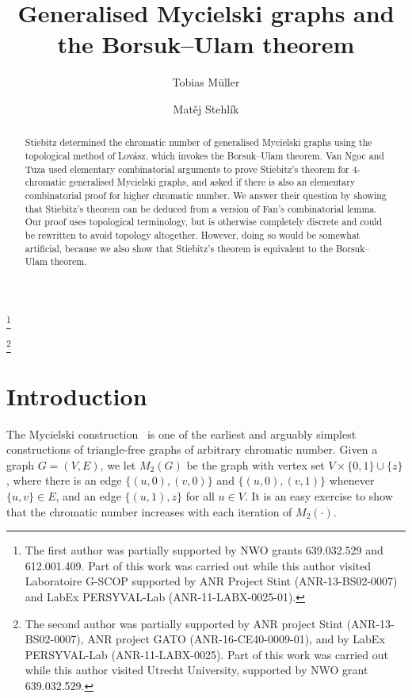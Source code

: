 \documentclass[11pt,a4paper]{amsart}
\begin{document}
\suppressfloats
\title{Generalised Mycielski graphs and the Borsuk--Ulam theorem}
\author{Tobias M\"uller}
\thanks{The first author was partially supported by NWO grants 639.032.529
and 612.001.409. Part of this work was carried out while this  author visited
Laboratoire G-SCOP supported by ANR Project Stint (ANR-13-BS02-0007) and
LabEx PERSYVAL-Lab (ANR-11-LABX-0025-01).}
\address{Johann Bernoulli Institute, Groningen University, The Netherlands}
\author{Mat\v ej Stehl\'ik}
\thanks{The second author was partially supported by ANR project Stint
(ANR-13-BS02-0007), ANR project GATO (ANR-16-CE40-0009-01), and by LabEx
PERSYVAL-Lab (ANR-11-LABX-0025). Part of this work was carried out while this
author visited Utrecht University, supported by NWO grant 639.032.529.}
\address{Laboratoire G-SCOP, Univ.\ Grenoble Alpes, France}

\begin{abstract}
  Stiebitz determined the chromatic number of generalised
  Mycielski graphs using the topological method of Lov\'asz,
  which invokes the Borsuk--Ulam theorem. Van Ngoc and Tuza
  used elementary combinatorial arguments to prove Stiebitz's
  theorem for $4$-chromatic generalised Mycielski graphs, and
  asked if there is also an elementary combinatorial proof for
  higher chromatic number. We answer their question by showing
  that Stiebitz's theorem can be deduced from a version of Fan's
  combinatorial lemma. Our proof uses topological terminology,
  but is otherwise completely discrete and could be rewritten to
  avoid topology altogether. However, doing so would be somewhat
  artificial, because we also show that Stiebitz's theorem is
  equivalent to the Borsuk--Ulam theorem.
\end{abstract}
\maketitle

\section{Introduction}

The Mycielski construction~\cite{Myc55} is one of the earliest and
arguably simplest constructions of triangle-free graphs of
arbitrary chromatic number. Given a graph $G=(V,E)$, we let
$M_2(G)$ be the graph with vertex set $V \times \{0,1\} \cup \{z\}$,
where there is an edge $\{(u,0),(v,0)\}$ and $\{(u,0),(v,1)\}$ whenever
$\{u,v\} \in E$, and an edge $\{(u,1),z\}$ for all $u \in V$.
It is an easy exercise to show that the chromatic number increases
with each iteration of $M_2(\cdot)$.
\end{document}
